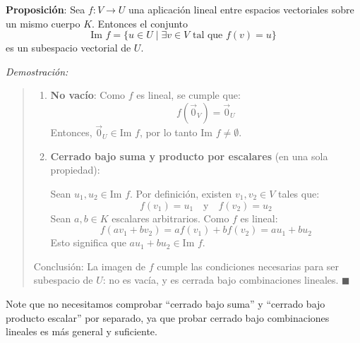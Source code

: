\textbf{Proposición}: Sea \(f: V \to U\) una aplicación lineal entre espacios vectoriales sobre un mismo cuerpo \(K\). Entonces el conjunto
\[
\text{Im } f = \{ u \in U \mid \exists v \in V \text{ tal que } f(v) = u \}
\]
es un subespacio vectorial de \(U\).

\textit{Demostración:}
\begin{quote}
  \begin{enumerate}
    \item \textbf{No vacío}:
      Como \(f\) es lineal, se cumple que:
      \[
      f(\vec{0}_V) = \vec{0}_U
      \]
      Entonces, \(\vec{0}_U \in \text{Im } f\), por lo tanto \(\text{Im } f \ne \emptyset\).

    \item \textbf{Cerrado bajo suma y producto por escalares} (en una sola propiedad):

      Sean \(u_1, u_2 \in \text{Im } f\).
      Por definición, existen \(v_1, v_2 \in V\) tales que:
      \[
      f(v_1) = u_1 \quad \text{y} \quad f(v_2) = u_2
      \]
      Sean \(a, b \in K\) escalares arbitrarios. Como \(f\) es lineal:
      \[
      f(a v_1 + b v_2) = a f(v_1) + b f(v_2) = a u_1 + b u_2
      \]
      Esto significa que \(a u_1 + b u_2 \in \text{Im } f\).
  \end{enumerate}

  Conclusión: La imagen de \(f\) cumple las condiciones necesarias para ser subespacio de \(U\): no es vacía, y es cerrada bajo combinaciones lineales.
  \(\blacksquare\)
\end{quote}

\begin{tcolorbox}[title=Observaciones]
  Note que no necesitamos comprobar ``cerrado bajo suma'' y ``cerrado bajo producto escalar'' por separado, ya que probar cerrado bajo combinaciones lineales es más general y suficiente.
\end{tcolorbox}
